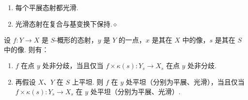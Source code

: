 \begin{remark}\label{item:ag-3-4-4}
\begin{enumerate}[label=(\roman*)]
\item 每个平展态射都光滑.
\item 光滑态射在复合与基变换下保持.\unskip\nobreak\hfill\ensuremath{\diamond}
\end{enumerate}
\renewcommand{\envenddiamond}{}
\end{remark}
\begin{proposition}[逐纤维判别准则]\label{item:ag-3-4-5}
设 $f:Y\longrightarrow X$ 是 $S$-概形的态射，$y$ 是 $Y$ 的一点，$x$ 是其在 $X$ 中的像，$s$ 是其在 $S$ 中的像. 则有：
\begin{enumerate}[label=\roman*)]
\item $f$ 在点 $y$ 处非分歧，当且仅当 $f\times\kappa(s):Y_s\longrightarrow X_s$ 在点 $y$ 处非分歧.
\item 再假设 $X$、$Y$ 在 $S$ 上平坦. 则 $f$ 在 $y$ 处平坦（分别为平展、光滑），当且仅当 $f\times\kappa(s):Y_s\longrightarrow X_s$ 在 $y$ 处平坦（分别为平展、光滑）.
\end{enumerate}
\end{proposition}
